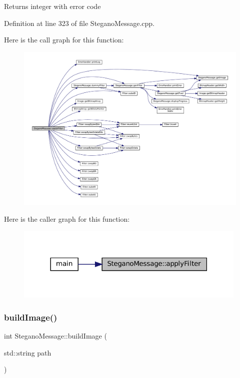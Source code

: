\begin{DoxyReturn}{Returns}
integer with error code 
\end{DoxyReturn}


Definition at line 323 of file Stegano\+Message.\+cpp.

Here is the call graph for this function\+:\nopagebreak
\begin{figure}[H]
\begin{center}
\leavevmode
\includegraphics[width=350pt]{classSteganoMessage_aec575d6949cf2eb49adefe2f1299d075_cgraph}
\end{center}
\end{figure}
Here is the caller graph for this function\+:\nopagebreak
\begin{figure}[H]
\begin{center}
\leavevmode
\includegraphics[width=314pt]{classSteganoMessage_aec575d6949cf2eb49adefe2f1299d075_icgraph}
\end{center}
\end{figure}
\mbox{\label{classSteganoMessage_ad90a4cf8cf03febfb4c3df955ccab13d}} 
\subsubsection{\texorpdfstring{buildImage()}{buildImage()}}
{\footnotesize\ttfamily int Stegano\+Message\+::build\+Image (\begin{DoxyParamCaption}\item[{std\+::string}]{path }\end{DoxyParamCaption})}




